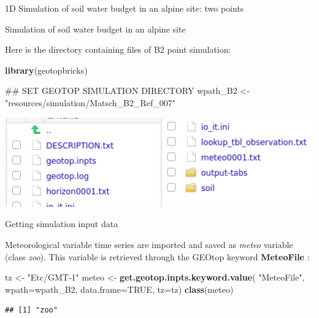 \documentclass[ignorenonframetext,]{beamer}
\newenvironment{Shaded}{\begin{snugshade}}{\end{snugshade}}
\newcommand{\KeywordTok}[1]{\textcolor[rgb]{0.13,0.29,0.53}{\textbf{#1}}}
\newcommand{\DataTypeTok}[1]{\textcolor[rgb]{0.13,0.29,0.53}{#1}}
\newcommand{\StringTok}[1]{\textcolor[rgb]{0.31,0.60,0.02}{#1}}
\newcommand{\OtherTok}[1]{\textcolor[rgb]{0.56,0.35,0.01}{#1}}
\newcommand{\NormalTok}[1]{#1}
\begin{document}
\begin{frame}{1D Simulation of soil water budget in an alpine site: two
points}
\end{frame}

\begin{frame}[fragile]{Simulation of soil water budget in an alpine
site}

Here is the directory containing files of B2 point simulation:

\begin{Shaded}
\begin{Highlighting}[]
\KeywordTok{library}\NormalTok{(geotopbricks) }

\NormalTok{## SET GEOTOP SIMULATION DIRECTORY}
\NormalTok{wpath_B2 <-}\StringTok{ "resources/simulation/Matsch_B2_Ref_007"} 
\end{Highlighting}
\end{Shaded}

\includegraphics[width=1.00000\textwidth]{resources/images/geotop_folder_B2.png}\\

\end{frame}

\begin{frame}[fragile]{Getting simulation input data}

Meteorological variable time series are imported and saved as
\emph{meteo} variable (class \emph{zoo}). This variable is retrieved
through the GEOtop keyword \textbf{MeteoFile} :

\begin{Shaded}
\begin{Highlighting}[]
\NormalTok{tz <-}\StringTok{ "Etc/GMT-1"}
\NormalTok{meteo <-}\StringTok{ }\KeywordTok{get.geotop.inpts.keyword.value}\NormalTok{(}
  \StringTok{"MeteoFile"}\NormalTok{,}
  \DataTypeTok{wpath=}\NormalTok{wpath_B2,}
  \DataTypeTok{data.frame=}\OtherTok{TRUE}\NormalTok{,}
  \DataTypeTok{tz=}\NormalTok{tz)}
\KeywordTok{class}\NormalTok{(meteo)}
\end{Highlighting}
\end{Shaded}

\begin{verbatim}
## [1] "zoo"
\end{verbatim}

\end{frame}
\end{document}
